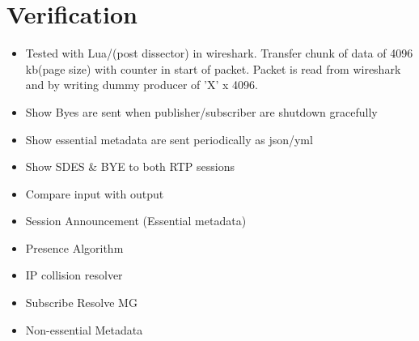 \section{Verification} \label{sec:design:verification}
\begin{itemize}
	\item Tested with Lua/(post dissector) in wireshark. Transfer chunk of data of 4096 kb(page size) with counter in start of packet. Packet is read from wireshark and by writing dummy producer of 'X' x 4096.

	\item Show Byes are sent when publisher/subscriber are shutdown gracefully

	\item Show essential metadata are sent periodically as json/yml
	\item Show SDES \& BYE to both RTP sessions
	
\end{itemize}



\begin{itemize}
	\item Compare \con{} input with \pro{} output
	\item Session Announcement (Essential metadata)
	\item Presence Algorithm
	\item IP collision resolver
	\item Subscribe Resolve MG
	\item Non-essential Metadata
\end{itemize}


